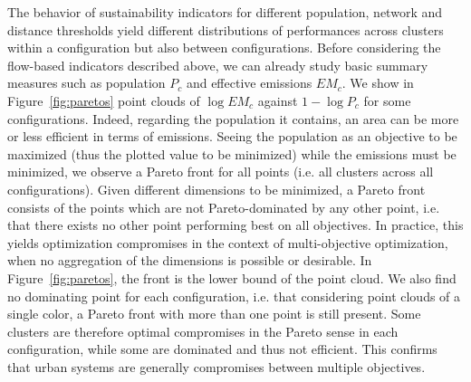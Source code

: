 \documentclass{jimis-en}
\begin{document}
The behavior of sustainability indicators for different population, network and distance thresholds yield different distributions of performances across clusters within a configuration but also between configurations. Before considering the flow-based indicators described above, we can already study basic summary measures such as population $P_c$ and effective emissions $EM_c$. We show in Figure~\ref{fig:paretos} point clouds of $\log EM_c$ against $1 - \log P_c$ for some configurations. Indeed, regarding the population it contains, an area can be more or less efficient in terms of emissions. Seeing the population as an objective to be maximized (thus the plotted value to be minimized) while the emissions must be minimized, we observe a Pareto front for all points (i.e. all clusters across all configurations). Given different dimensions to be minimized, a Pareto front consists of the points which are not Pareto-dominated by any other point, i.e. that there exists no other point performing best on all objectives. In practice, this yields optimization compromises in the context of multi-objective optimization, when no aggregation of the dimensions is possible or desirable. In Figure~\ref{fig:paretos}, the front is the lower bound of the point cloud. We also find no dominating point for each configuration, i.e. that considering point clouds of a single color, a Pareto front with more than one point is still present. Some clusters are therefore optimal compromises in the Pareto sense in each configuration, while some are dominated and thus not efficient. This confirms that urban systems are generally compromises between multiple objectives.
\end{document}
